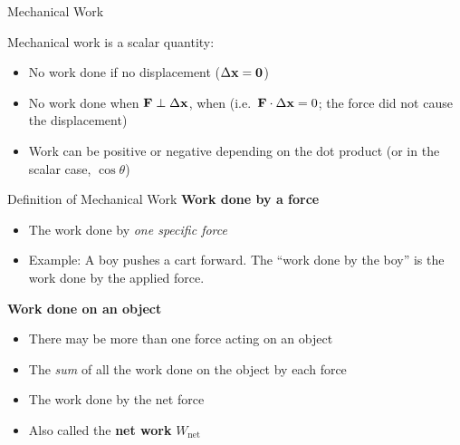 \documentclass[12pt,compress,aspectratio=169]{beamer}
\newcommand{\mb}[1]{\ensuremath\mathbf{#1}}
\newcommand{\eq}[2]{\vspace{#1}{\Large\begin{displaymath}#2\end{displaymath}}}
\begin{document}
\begin{frame}{Mechanical Work}

  Mechanical work is a scalar quantity:
  
  \eq{-.2in}{
    \boxed{W=\mb{F}\cdot\Delta\mb{x}}
  }
  
%
  \begin{itemize}
  \item No work done if no displacement ($\Delta\mb{x}=\mb{0}$)
  \item No work done when $\mb{F}\perp\Delta\mb{x}$, when (i.e.\
    $\mb{F}\cdot\Delta\mb{x}=0$; the force did not cause the displacement)
  \item Work can be positive or negative depending on the dot product (or in
    the scalar case, $\cos\theta$)
  \end{itemize}
\end{frame}



%
%
%




\begin{frame}{Definition of Mechanical Work}
  \textbf{Work done by a force}
  \begin{itemize}
  \item The work done by \emph{one specific force}
  \item Example: A boy pushes a cart forward. The ``work done by the boy'' is
    the work done by the applied force.
  \end{itemize}

  \vspace{.15in}\textbf{Work done on an object}
  \begin{itemize}
  \item There may be more than one force acting on an object
  \item The \emph{sum} of all the work done on the object by each force
  \item The work done by the net force
  \item Also called the \textbf{net work} $W_\mathrm{net}$
  \end{itemize}
\end{frame}
\end{document}
